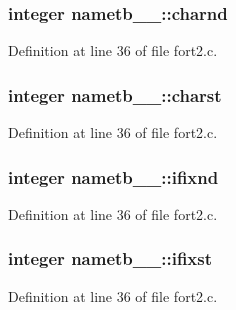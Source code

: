 \subsubsection[{\texorpdfstring{charnd}{charnd}}]{\setlength{\rightskip}{0pt plus 5cm}integer nametb\+\_\+\_\+\+::charnd}\hypertarget{structnametb__1___a229d94d5a0e4d3e189c72c0ec1c38062}{}\label{structnametb__1___a229d94d5a0e4d3e189c72c0ec1c38062}


Definition at line 36 of file fort2.\+c.

\subsubsection[{\texorpdfstring{charst}{charst}}]{\setlength{\rightskip}{0pt plus 5cm}integer nametb\+\_\+\_\+\+::charst}\hypertarget{structnametb__1___a67e1604c3e8d0c95ea9c1fc6cbf51a96}{}\label{structnametb__1___a67e1604c3e8d0c95ea9c1fc6cbf51a96}


Definition at line 36 of file fort2.\+c.

\subsubsection[{\texorpdfstring{ifixnd}{ifixnd}}]{\setlength{\rightskip}{0pt plus 5cm}integer nametb\+\_\+\_\+\+::ifixnd}\hypertarget{structnametb__1___aa7632ff056b72e3a9df73ab79187ba42}{}\label{structnametb__1___aa7632ff056b72e3a9df73ab79187ba42}


Definition at line 36 of file fort2.\+c.

\subsubsection[{\texorpdfstring{ifixst}{ifixst}}]{\setlength{\rightskip}{0pt plus 5cm}integer nametb\+\_\+\_\+\+::ifixst}\hypertarget{structnametb__1___aa8dbf908c0dc5e92e16209f1c24411b5}{}\label{structnametb__1___aa8dbf908c0dc5e92e16209f1c24411b5}


Definition at line 36 of file fort2.\+c.

